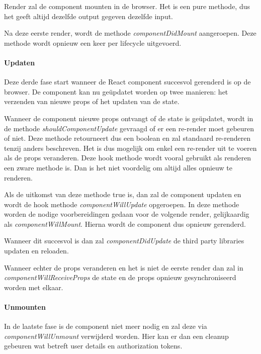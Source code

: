 Render zal de component mounten in de browser. Het is een pure methode, dus het geeft altijd dezelfde output gegeven dezelfde input. 

Na deze eerste render, wordt de methode \textit{componentDidMount} aangeroepen. Deze methode wordt opnieuw een keer per lifecycle uitgevoerd. 

\paragraph{Updaten}
Deze derde fase start wanneer de React component succesvol gerenderd is op de browser. De component kan nu geüpdatet worden op twee manieren: het verzenden van nieuwe props of het updaten van de state. 

Wanneer de component nieuwe props ontvangt of de state is geüpdatet, wordt in de methode \textit{shouldComponentUpdate} gevraagd of er een re-render moet gebeuren of niet. Deze methode retourneert dus een boolean en zal standaard re-renderen tenzij anders beschreven. Het is dus mogelijk om enkel een re-render uit te voeren als de props veranderen. Deze hook methode wordt vooral gebruikt als renderen een zware methode is. Dan is het niet voordelig om altijd alles opnieuw te renderen.

Als de uitkomst van deze methode true is, dan zal de component updaten en wordt de hook methode \textit{componentWillUpdate} opgeroepen. In deze methode worden de nodige voorbereidingen gedaan voor de volgende render, gelijkaardig als \textit{componentWillMount}. Hierna wordt de component dus opnieuw gerenderd. 

Wanneer dit succesvol is dan zal \textit{componentDidUpdate} de third party libraries updaten en reloaden. 

Wanneer echter de props veranderen en het is niet de eerste render dan zal in \textit{componentWillReceiveProps} de state en de props opnieuw gesynchroniseerd worden met elkaar. 

\paragraph{Unmounten}
In de laatste fase is de component niet meer nodig en zal deze via \textit{componentWillUnmount} verwijderd worden. Hier kan er dan een cleanup gebeuren wat betreft user details en authorization tokens.
\autocite{reactlifecycle}
\autocite{reactlifecycle2}


